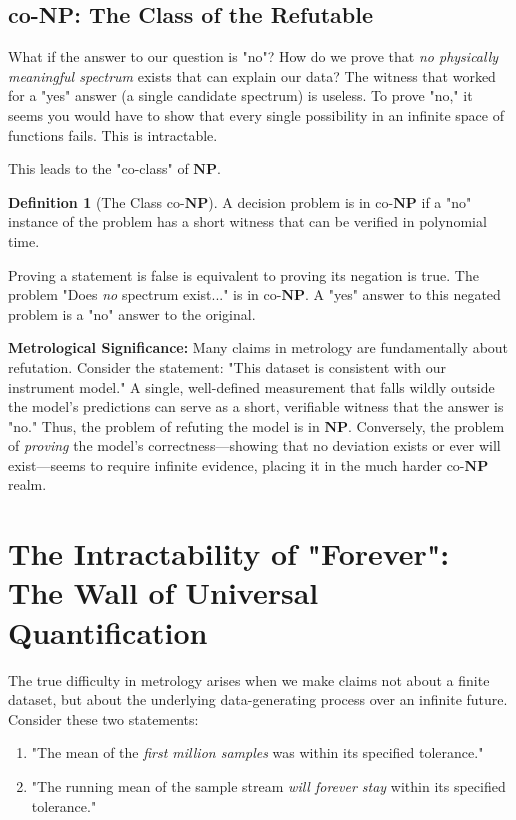 \documentclass[12pt]{article}
\theoremstyle{definition}
\newtheorem{definition}{Definition}[section]
\begin{document}
\subsection{co-NP: The Class of the Refutable}

What if the answer to our question is "no"? How do we prove that \emph{no physically meaningful spectrum} exists that can explain our data? The witness that worked for a "yes" answer (a single candidate spectrum) is useless. To prove "no," it seems you would have to show that every single possibility in an infinite space of functions fails. This is intractable.

This leads to the "co-class" of $\mathbf{NP}$.

\begin{definition}[The Class co-$\mathbf{NP}$]
A decision problem is in co-$\mathbf{NP}$ if a "no" instance of the problem has a short witness that can be verified in polynomial time.
\end{definition}

Proving a statement is false is equivalent to proving its negation is true. The problem "Does \emph{no} spectrum exist..." is in co-$\mathbf{NP}$. A "yes" answer to this negated problem is a "no" answer to the original.

\textbf{Metrological Significance:} Many claims in metrology are fundamentally about refutation. Consider the statement: "This dataset is consistent with our instrument model." A single, well-defined measurement that falls wildly outside the model's predictions can serve as a short, verifiable witness that the answer is "no." Thus, the problem of refuting the model is in $\mathbf{NP}$. Conversely, the problem of \emph{proving} the model's correctness—showing that no deviation exists or ever will exist—seems to require infinite evidence, placing it in the much harder co-$\mathbf{NP}$ realm.

\section{The Intractability of "Forever": The Wall of Universal Quantification}

The true difficulty in metrology arises when we make claims not about a finite dataset, but about the underlying data-generating process over an infinite future. Consider these two statements:

\begin{enumerate}
    \item "The mean of the \emph{first million samples} was within its specified tolerance."
    \item "The running mean of the sample stream \emph{will forever stay} within its specified tolerance."
\end{enumerate}
\end{document}
